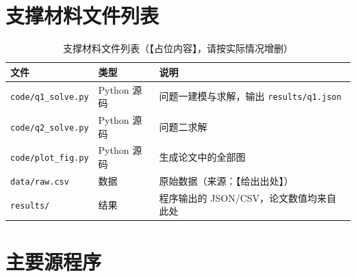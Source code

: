 \documentclass[12pt,a4paper,fontset=windows]{ctexart}
\begin{document}
\newpage
\appendix
\section{支撑材料文件列表}
\begin{table}[htbp]
  \centering
  \caption{支撑材料文件列表（【占位内容】，请按实际情况增删）}
  \label{tab:files}
  \begin{tabular}{llp{7.2cm}}
    \toprule
    文件 & 类型 & 说明 \\
    \midrule
    \texttt{code/q1\_solve.py} & Python 源码 & 问题一建模与求解，输出 \texttt{results/q1.json} \\
    \texttt{code/q2\_solve.py} & Python 源码 & 问题二求解 \\
    \texttt{code/plot\_fig.py} & Python 源码 & 生成论文中的全部图 \\
    \texttt{data/raw.csv}      & 数据       & 原始数据（来源：【给出出处】） \\
    \texttt{results/}          & 结果        & 程序输出的 JSON/CSV，论文数值均来自此处 \\
    \bottomrule
  \end{tabular}
\end{table}

\section{主要源程序}
%   
\end{document}
